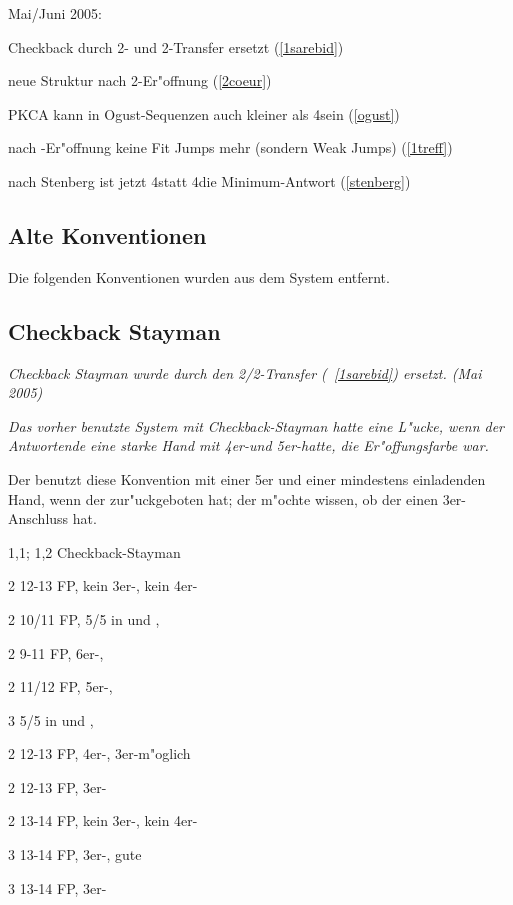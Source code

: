 \begin{appendix}
Mai/Juni 2005:
\begin{compactitem}
\item Checkback durch 2\tre- und 2\SA-Transfer ersetzt (\ra \ref{1sarebid})
\item neue Struktur nach 2\coe-Er"offnung (\ra \ref{2coeur})
\item PKCA kann in Ogust-Sequenzen auch kleiner als 4\tre sein (\ra \ref{ogust})
\item nach \ufa-Er"offnung keine Fit Jumps mehr (sondern Weak Jumps) (\ra \ref{1treff})
\item nach Stenberg ist jetzt 4\tre statt 4\of die Minimum-Antwort (\ra \ref{stenberg})
\end{compactitem}

\subsection{Alte Konventionen}

Die folgenden Konventionen wurden aus dem System entfernt.

\subsection*{Checkback Stayman}

\emph{Checkback Stayman wurde durch den 2\tre/2\SA-Transfer (\ra~\ref{1sarebid})
ersetzt. (Mai 2005)}

\emph{Das vorher benutzte System mit Checkback-Stayman hatte eine L"ucke, wenn der Antwortende
eine starke Hand mit 4er-\ofa und 5er-\ufa hatte, die Er"offungsfarbe war.}

Der \aw benutzt diese Konvention mit einer 5er \ofa und einer mindestens
einladenden Hand, wenn der \SA zur"uckgeboten hat; der \aw m"ochte
wissen, ob der \eo einen 3er-Anschluss hat.

\bdsc
\item[1\ufa{}\sep1\pik; 1\SA{}\sep2\tre] Checkback-Stayman
 \bdsc
 \item[2\kar] 12-13\bad{} FP, kein 3er-\pi, kein 4er-\co
  \bdsc
  \item[2\coe] 10/11 FP, 5/5 in \co und \pi, \nf
  \item[2\pik] 9-11 FP, 6er-\pi, \nf
  \item[2\SA] 11/12 FP, 5er-\pi, \nf
  \item[3\coe] 5/5 in \co und \pi, \slamint
  \edsc
 \item[2\coe] 12-13\bad{} FP, 4er-\co, 3er-\pi m"oglich
 \item[2\pik] 12-13\bad{} FP, 3er-\pi
 \item[2\SA]  13\good{}-14 FP, kein 3er-\pi, kein 4er-\co
 \item[3\ufa] 13\good{}-14 FP, 3er-\pi, gute \ufa
 \item[3\pik] 13\good{}-14 FP, 3er-\pi
 \edsc
\edsc


\end{appendix}
